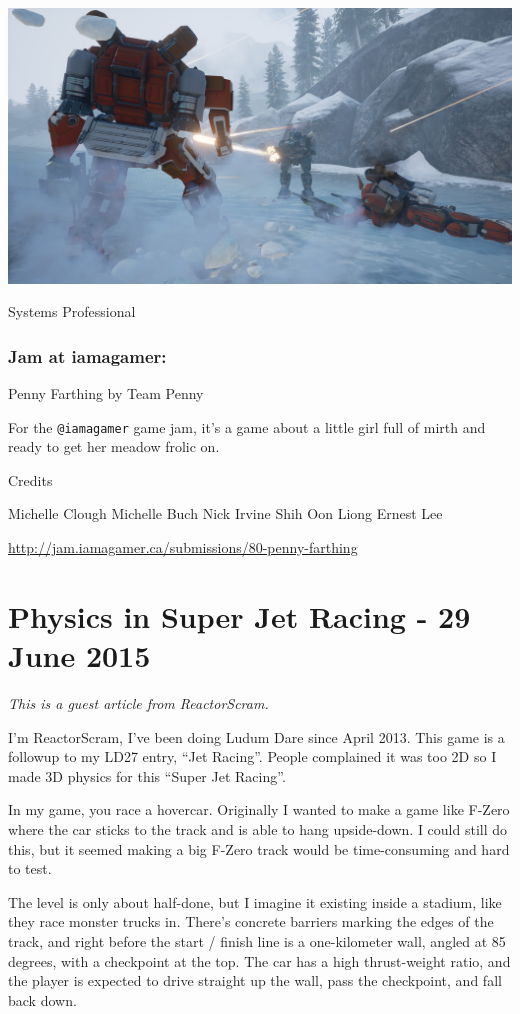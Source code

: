\documentclass[]{book}
\begin{document}
\includegraphics{Image/HeavyGearAssaultPromoImage.jpg}

Systems Professional

\subsection{Jam at iamagamer:}\label{jam-at-iamagamer}

Penny Farthing by Team Penny

For the \texttt{@iamagamer} game jam, it's a game about a little girl
full of mirth and ready to get her meadow frolic on.

Credits

Michelle Clough Michelle Buch Nick Irvine Shih Oon Liong Ernest Lee

\url{http://jam.iamagamer.ca/submissions/80-penny-farthing}

\chapter{Physics in Super Jet Racing - 29 June
2015}\label{physics-in-super-jet-racing---29-june-2015}

\emph{This is a guest article from ReactorScram.}

I'm ReactorScram, I've been doing Ludum Dare since April 2013. This game
is a followup to my LD27 entry, ``Jet Racing''. People complained it was
too 2D so I made 3D physics for this ``Super Jet Racing''.

In my game, you race a hovercar. Originally I wanted to make a game like
F-Zero where the car sticks to the track and is able to hang
upside-down. I could still do this, but it seemed making a big F-Zero
track would be time-consuming and hard to test.

The level is only about half-done, but I imagine it existing inside a
stadium, like they race monster trucks in. There's concrete barriers
marking the edges of the track, and right before the start / finish line
is a one-kilometer wall, angled at 85 degrees, with a checkpoint at the
top. The car has a high thrust-weight ratio, and the player is expected
to drive straight up the wall, pass the checkpoint, and fall back down.
\end{document}
